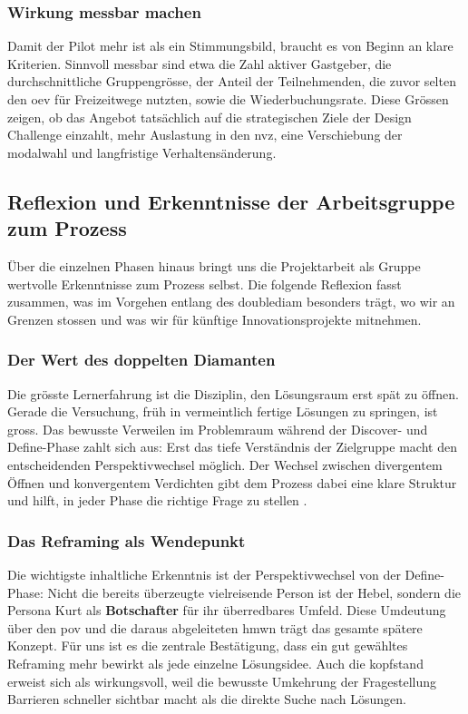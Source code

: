 \subsubsection{Wirkung messbar machen}
Damit der Pilot mehr ist als ein Stimmungsbild, braucht es von Beginn an klare Kriterien. Sinnvoll messbar sind etwa die Zahl aktiver Gastgeber, die durchschnittliche Gruppengrösse, der Anteil der Teilnehmenden, die zuvor selten den \gls{oev} für Freizeitwege nutzten, sowie die Wiederbuchungsrate. Diese Grössen zeigen, ob das Angebot tatsächlich auf die strategischen Ziele der Design Challenge einzahlt, mehr Auslastung in den \gls{nvz}, eine Verschiebung der \gls{modalwahl} und langfristige Verhaltensänderung.

\subsection{Reflexion und Erkenntnisse der Arbeitsgruppe zum Prozess}

Über die einzelnen Phasen hinaus bringt uns die Projektarbeit als Gruppe wertvolle Erkenntnisse zum Prozess selbst. Die folgende Reflexion fasst zusammen, was im Vorgehen entlang des \gls{doublediam} besonders trägt, wo wir an Grenzen stossen und was wir für künftige Innovationsprojekte mitnehmen.

\subsubsection{Der Wert des doppelten Diamanten}
Die grösste Lernerfahrung ist die Disziplin, den Lösungsraum erst spät zu öffnen. Gerade die Versuchung, früh in vermeintlich fertige Lösungen zu springen, ist gross. Das bewusste Verweilen im Problemraum während der Discover- und Define-Phase zahlt sich aus: Erst das tiefe Verständnis der Zielgruppe macht den entscheidenden Perspektivwechsel möglich. Der Wechsel zwischen divergentem Öffnen und konvergentem Verdichten gibt dem Prozess dabei eine klare Struktur und hilft, in jeder Phase die richtige Frage zu stellen \parencite{designcouncil2005}.

\subsubsection{Das Reframing als Wendepunkt}
Die wichtigste inhaltliche Erkenntnis ist der Perspektivwechsel von der Define-Phase: Nicht die bereits überzeugte vielreisende Person ist der Hebel, sondern die Persona Kurt als \textbf{Botschafter} für ihr überredbares Umfeld. Diese Umdeutung über den \gls{pov} und die daraus abgeleiteten \gls{hmw}n trägt das gesamte spätere Konzept. Für uns ist es die zentrale Bestätigung, dass ein gut gewähltes Reframing mehr bewirkt als jede einzelne Lösungsidee. Auch die \gls{kopfstand} erweist sich als wirkungsvoll, weil die bewusste Umkehrung der Fragestellung Barrieren schneller sichtbar macht als die direkte Suche nach Lösungen.

